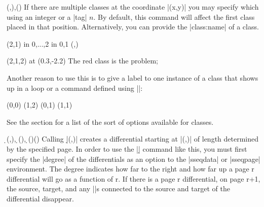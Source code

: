 \documentclass{ltxdoc}
\begin{document}
\begin{sseqdata}[name=ex1,degree={#1}{1-#1}]
\begin{commandlist}{{(,)},()}
If there are multiple classes at the coordinate |(x,y)| you may specify which using an integer or a |tag| $n$. By default, this command will affect the first class placed in that position. Alternatively, you can provide the |class:name| of a class.
\begin{codeexample}[width=5cm]
\begin{sseqdata}[name=class options example,classes=fill]
\class(2,1)
\foreach \x in {0,...,2} \foreach \y in {0,1}{
    \class(\x,\y)
}
\end{sseqdata}
\begin{sseqpage}[name=class options example,right clip padding=0.6cm]
\classoptions[red](2,1,2) %
\node[background,text width=10em] at (0.3,-2.2)
    {\textup{The red class is the problem}};
\end{sseqpage}
\end{codeexample}
Another reason to use this is to give a label to one instance of a class that shows up in a loop or a command defined using |\sseqnewgroup|:
\begin{codeexample}[width=6cm]
\sseqnewgroup{}
\begin{sseqpage}[classes=fill,class labels={left=0.3em},math nodes]
\mygroup(0,0)
\mygroup(1,2)
\classoptions["2"](0,1)
\classoptions["\eta"](1,1)
\end{sseqpage}
\end{codeexample}
See the  section for a list of the sort of options available for classes.
\end{commandlist}

\begin{commandlist}{
    {\d{}(,)},
    {\d{}()},
    {\d{}()()}%
}
Calling |\d{}(,)| creates a differential starting at |(,)| of length determined by the specified page. In order to use the |\d| command like this, you must first specify the |degree| of the differentials as an option to the |sseqdata| or |sseqpage| environment. The degree indicates how far to the right and how far up a page r differential will go as a function of r. If there is a page r differential, on page r+1, the source, target, and any |\structline|s connected to the source and target of the differential disappear.


\end{commandlist}
\end{sseqdata}
\end{document}
